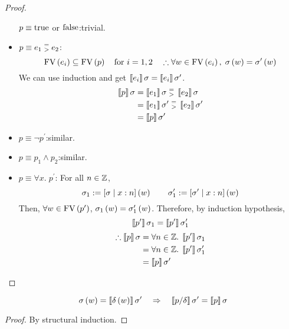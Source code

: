 \begin{enumcirc}
\begin{proof}
\begin{itemize}
			      $p \equiv \textrm{true}$ or $\textrm{false}$:\quad trivial.
			\item
			      $p \equiv e_1 \;\substack{=\\>}\; e_2$:
			      \[
				      \textrm{FV}\left(  e_i  \right) \subseteq \textrm{FV}\left(  p  \right) \quad \textrm{for } i = 1, 2 \quad
				      \therefore \forall w \in \textrm{FV}\left(  e_i  \right), \; \sigma\left( w \right) = \sigma^\prime\left( w \right)
			      \]
			      We can use induction and get
			      $ \left\llbracket e_i \right\rrbracket\sigma = \left\llbracket e_i \right\rrbracket\sigma^\prime $.
			      \begin{align*}
				      \left\llbracket p \right\rrbracket\sigma & = \left\llbracket e_1 \right\rrbracket\sigma \;\substack{=\\>}\; \left\llbracket e_2 \right\rrbracket\sigma               \\
				                          & = \left\llbracket e_1 \right\rrbracket\sigma^\prime \;\substack{=\\>}\; \left\llbracket e_2 \right\rrbracket\sigma^\prime \\
				                          & = \left\llbracket p \right\rrbracket\sigma^\prime
			      \end{align*}
			\item
			      $p \equiv \neg p^\prime$:\quad similar.
			\item
			      $p \equiv p_1 \wedge p_2$:\quad similar.
			\item
			      $p \equiv \forall x .\; p^\prime$:\quad
			      For all $n \in \mathbb{Z}$,
			      \[
				      \sigma_1 := \left[ \sigma \; \middle\vert \; x:n \right]\left( w \right) \qquad \sigma_1^\prime := \left[ \sigma^\prime \; \middle\vert \; x:n \right]\left( w \right)
			      \]
			      Then, $\forall w \in \textrm{FV}\left(  p^\prime  \right)$,
			      $\sigma_1\left( w \right) = \sigma_1^\prime\left( w \right)$.
			      Therefore, by induction hypothesis,
			      \[
				      \left\llbracket p^\prime \right\rrbracket\sigma_1 = \left\llbracket p^\prime \right\rrbracket\sigma_1^\prime
			      \]
			      \begin{align*}
				      \therefore \left\llbracket p \right\rrbracket\sigma & = \forall n \in \mathbb{Z} .\; \left\llbracket p^\prime \right\rrbracket\sigma_1        \\
				                                     & = \forall n \in \mathbb{Z} .\; \left\llbracket p^\prime \right\rrbracket\sigma_1^\prime \\
				                                     & = \left\llbracket p \right\rrbracket\sigma^\prime
			      \end{align*}
		\end{itemize}
	\end{proof}

	\begin{property}[Substitution]
		\[
			\sigma\left( w \right) = \left\llbracket \delta\left( w \right) \right\rrbracket\sigma^\prime
			\quad \Rightarrow \quad \left\llbracket p/\delta \right\rrbracket\sigma^\prime = \left\llbracket p \right\rrbracket\sigma
		\]
	\end{property}
	\begin{proof}
		By structural induction.
	\end{proof}


\end{enumcirc}
